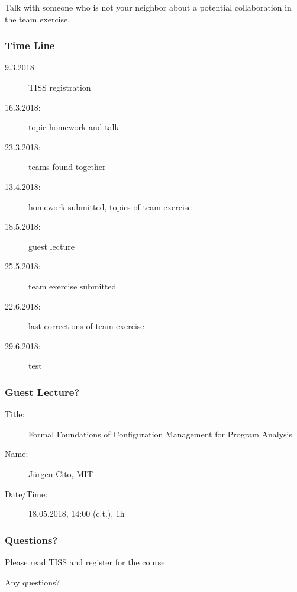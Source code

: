 \documentclass{beamer}
\begin{document}
\begin{assignment}
	\begin{task}
	Talk with someone who is not your neighbor about a potential collaboration in the team exercise.
	\end{task}
\end{assignment}

\begin{frame}
	\frametitle{Time Line}
	\begin{description}
		\item[9.3.2018:] TISS registration
		\item[16.3.2018:] topic homework and talk
		\item[23.3.2018:] teams found together
		\item[13.4.2018:] homework submitted, topics of team exercise
		\item[18.5.2018:] guest lecture
		\item[25.5.2018:] team exercise submitted
		\item[22.6.2018:] last corrections of team exercise
		\item[29.6.2018:] test
	\end{description}
\end{frame}

\begin{frame}
	\frametitle{Guest Lecture?}
	\begin{description}
		\item[Title:] Formal Foundations of Configuration Management for Program Analysis
		\item[Name:] Jürgen Cito, MIT
		\item[Date/Time:] 18.05.2018, 14:00 (c.t.), 1h
	\end{description}
\end{frame}

\begin{assignment}
	\frametitle{Questions?}
	\begin{task}
	Please read TISS and register for the course.
	\end{task}

	\begin{task}
	Any questions?
	\end{task}
\end{assignment}



\nocite{raab2017introducing}

\appendix

\begin{frame}[allowframebreaks]
	
	
\end{frame}
\end{document}
